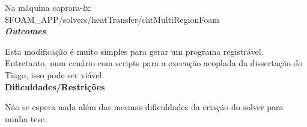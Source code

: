 Na máquina caprara-lx: \$FOAM\_APP/solvers/heatTransfer/chtMultiRegionFoam\\

\textbf{\textit{Outcomes}}

Esta modificação é muito simples para gerar um programa registrável. Entretanto, 
num cenário com scripts para a execução acoplada da dissertação do Tiago, isso 
pode ser viável.\\

\textbf{Dificuldades/Restrições}

Não se espera nada além das mesmas dificuldades da criação do solver para minha 
tese. \\

